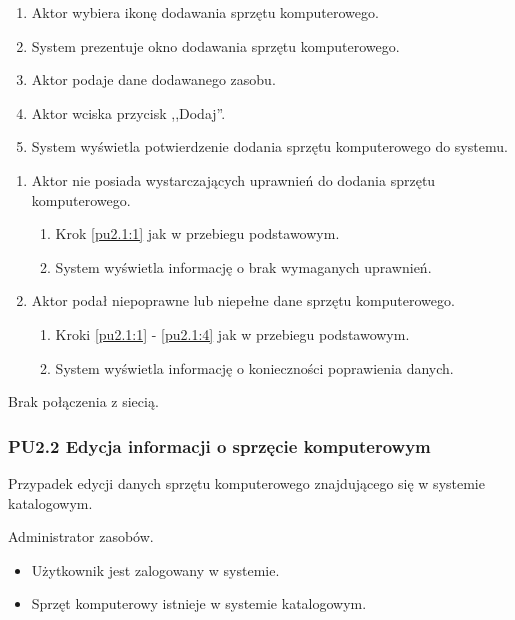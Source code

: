 \begin{enumerate}
\item \label{pu2.1:1} Aktor wybiera ikonę dodawania sprzętu komputerowego.
\item System prezentuje okno dodawania sprzętu komputerowego.
\item Aktor podaje dane dodawanego zasobu.
\item \label{pu2.1:4} Aktor wciska przycisk ,,Dodaj''.
\item System wyświetla potwierdzenie dodania sprzętu komputerowego do systemu.
\end{enumerate}

\begin{enumerate}
\item Aktor nie posiada wystarczających uprawnień do dodania sprzętu komputerowego.
	\begin{enumerate}[label*=\arabic*.]
		\item Krok \ref{pu2.1:1} jak w przebiegu podstawowym.
		\item System wyświetla informację o brak wymaganych uprawnień.
	\end{enumerate}
\item Aktor podał niepoprawne lub niepełne dane sprzętu komputerowego.
	\begin{enumerate}[label*=\arabic*.]
		\item Kroki \ref{pu2.1:1} - \ref{pu2.1:4} jak w przebiegu podstawowym.
		\item System wyświetla informację o konieczności poprawienia danych.
	\end{enumerate}
\end{enumerate}

Brak połączenia z siecią.



\subsubsection{PU2.2 Edycja informacji o sprzęcie komputerowym}

Przypadek edycji danych sprzętu komputerowego znajdującego się w systemie katalogowym.

Administrator zasobów.

\begin{itemize}
\item Użytkownik jest zalogowany w systemie.
\item Sprzęt komputerowy istnieje w systemie katalogowym.
\end{itemize}

